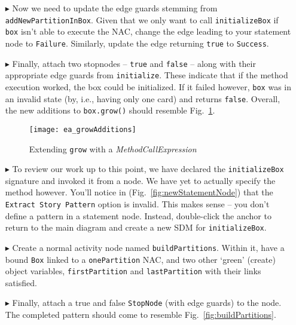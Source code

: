 \begin{itemize}
\clearpage

\item[$\blacktriangleright$] Now we need to update the edge guards stemming from \texttt{add\-New\-Part\-ition\-In\-Box}. Given that we only want to call
\texttt{initializeBox} if \texttt{box} isn't able to execute the NAC, change the edge leading to your statement node to \texttt{Failure}. Similarly, update the
edge returning \texttt{true} to \texttt{Success}.

\item[$\blacktriangleright$] Finally, attach two stopnodes -- \texttt{true} and \texttt{false} -- along with their appropriate edge guards from
\texttt{initialize}. These indicate that if the method execution worked, the box could be initialized. If it failed however, \texttt{box} was
in an invalid state (by, i.e., having only one card) and returns \texttt{false}. Overall, the new additions to \texttt{box.grow()} should resemble Fig.~\ref{fig:newGrowControl}.

\vspace{0.5cm}

\begin{figure}[htp]
\begin{center}
  \texttt{[image: ea\_growAdditions]}
  \caption{Extending \texttt{grow} with a \emph{MethodCallExpression}}
  \label{fig:newGrowControl}
\end{center}
\end{figure}

\item[$\blacktriangleright$] To review our work up to this point, we have declared the \texttt{initializeBox} signature and invoked it from a node. We have yet
to actually specify the method however. You'll notice in (Fig.~\ref{fig:newStatementNode}) that the \texttt{Extract Story Pattern} option is invalid. This
makes sense -- you don't define a pattern in a statement node. Instead, double-click the anchor to return to the main diagram and create a new SDM
for \texttt{initializeBox}.

\item[$\blacktriangleright$] Create a normal activity node named \texttt{buildPartitions}. Within it, have a bound \texttt{Box} linked to a
\texttt{onePartition} NAC, and two other `green' (create) object variables, \texttt{firstPartition} and \texttt{lastPartition} with their links satisfied.

\item[$\blacktriangleright$] Finally, attach a true and false \texttt{StopNode} (with edge guards) to the node. The completed pattern should come to resemble
Fig.~\ref{fig:buildPartitions}.


\end{itemize}
